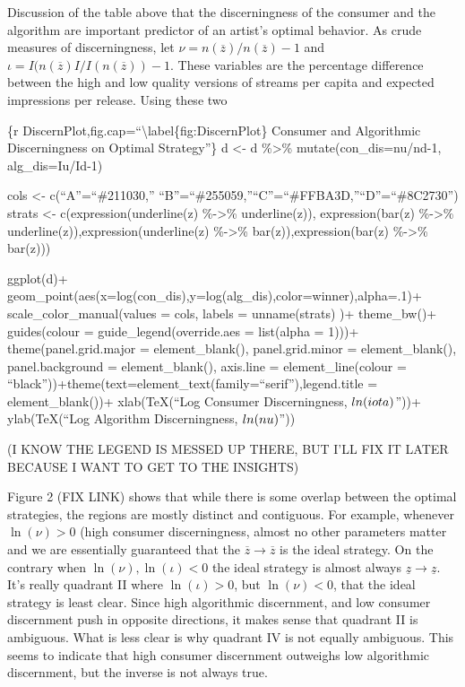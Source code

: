\documentclass[
]{article}
\begin{document}
Discussion of the table above that the discerningness of the consumer
and the algorithm are important predictor of an artist's optimal
behavior. As crude measures of discerningness, let
\(\nu=n(\overline{z})/n(\overline{z})-1\) and
\(\iota=I(n(\overline{z})I/I(n(\overline{z}))-1\). These variables are
the percentage difference between the high and low quality versions of
streams per capita and expected impressions per release. Using these two

\{r DiscernPlot,fig.cap=``\textbackslash label\{fig:DiscernPlot\}
Consumer and Algorithmic Discerningness on Optimal Strategy''\} d
\textless- d \%\textgreater\% mutate(con\_dis=nu/nd-1, alg\_dis=Iu/Id-1)

cols \textless- c(``A''=``\#211030,''
``B''=``\#255059,''``C''=``\#FFBA3D,''``D''=``\#8C2730'') strats
\textless- c(expression(underline(z) \%-\textgreater\% underline(z)),
expression(bar(z) \%-\textgreater\%
underline(z)),expression(underline(z) \%-\textgreater\%
bar(z)),expression(bar(z) \%-\textgreater\% bar(z)))

ggplot(d)+
geom\_point(aes(x=log(con\_dis),y=log(alg\_dis),color=winner),alpha=.1)+
scale\_color\_manual(values = cols, labels = unname(strats) )+
theme\_bw()+ guides(colour = guide\_legend(override.aes = list(alpha =
1)))+ theme(panel.grid.major = element\_blank(), panel.grid.minor =
element\_blank(), panel.background = element\_blank(), axis.line =
element\_line(colour =
``black''))+theme(text=element\_text(family=``serif''),legend.title =
element\_blank())+ xlab(TeX(``Log Consumer Discerningness,
\(\\ln(\\iota)\)''))+ ylab(TeX(``Log Algorithm Discerningness,
\(\\ln(\\nu)\)''))

(I KNOW THE LEGEND IS MESSED UP THERE, BUT I'LL FIX IT LATER BECAUSE I
WANT TO GET TO THE INSIGHTS)

Figure 2 (FIX LINK) shows that while there is some overlap between the
optimal strategies, the regions are mostly distinct and contiguous. For
example, whenever \(\ln(\nu)>0\) (high consumer discerningness, almost
no other parameters matter and we are essentially guaranteed that the
\(\overline{z}\to\overline{z}\) is the ideal strategy. On the contrary
when \(\ln(\nu),\ln(\iota)<0\) the ideal strategy is almost always
\(\underline{z}\to\underline{z}\). It's really quadrant II where
\(\ln(\iota)>0\), but \(\ln(\nu)<0\), that the ideal strategy is least
clear. Since high algorithmic discernment, and low consumer discernment
push in opposite directions, it makes sense that quadrant II is
ambiguous. What is less clear is why quadrant IV is not equally
ambiguous. This seems to indicate that high consumer discernment
outweighs low algorithmic discernment, but the inverse is not always
true.
\end{document}
